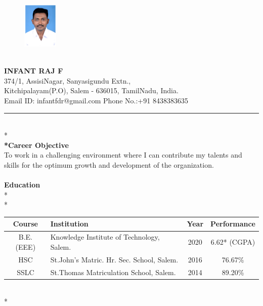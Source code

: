 \documentclass{article}
\begin{document}
	\begin{figure}
	\begin{center}
		\includegraphics[width=47pt]{Infantraj}
	\end{center}	
	\end{figure}
	\huge \textbf{\\INFANT RAJ F}  \\
	\large 374/1, AssisiNagar, Sanyasigundu Extn.,\\
	Kitchipalayam(P.O), Salem - 636015, TamilNadu, India.\\
	Email ID: infantfdr@gmail.com Phone No.:+91 8438383635\\
	\hrule 
	\\*
	\large \textbf{\\*Career Objective}\\
	\hspace*{20pt} To work in a challenging environment where I can contribute my talents and skills for the optimum growth and development of the organization.\\
	\large \textbf{\\Education}
	\\* \\*
	\begin{tabularx}{\linewidth}{|  c | X | c | c | }
 \hline 
\large \textbf{Course} & \large \centering \textbf{Institution} & \large \textbf{Year} & \large \textbf{Performance} \\ \hline
\large B.E. (EEE) & \large \centering Knowledge Institute of Technology, Salem.& \large 2020 & \large 6.62* (CGPA)\\ \hline
\large HSC & \large \centering St.John’s Matric. Hr. Sec. School, Salem. & \large 2016  & \large 76.67\% \\ \hline
\large SSLC & \large \centering St.Thomas Matriculation School, Salem. & \large 2014 & \large 89.20\% \\ \hline
\end{tabularx}
\\*
\end{document}
